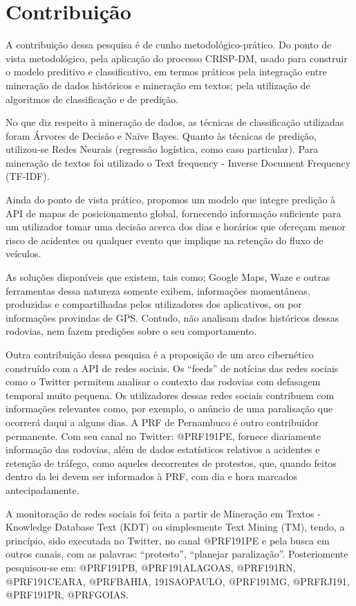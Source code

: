 \chapter{Contribuição}\label{meto}

A contribuição dessa pesquisa é de cunho metodológico-prático.
Do ponto de vista metodológico, pela aplicação do processo CRISP-DM, usado para construir o modelo preditivo e classificativo, em termos práticos pela integração entre mineração de dados históricos e mineração em textos; pela utilização de algoritmos de classificação e de predição. 

No que diz respeito à mineração de dados, as técnicas de classificação utilizadas foram Árvores de Decisão e Naïve Bayes. Quanto às técnicas de predição, utilizou-se Redes Neurais (regressão logística, como caso particular). Para mineração de textos foi utilizado o Text frequency - Inverse Document Frequency (TF-IDF).

Ainda do ponto de vista prático, propomos um modelo que integre predição à API de mapas de posicionamento global, fornecendo informação suficiente para um utilizador tomar uma decisão acerca dos dias e horários que ofereçam menor risco de acidentes ou qualquer evento que implique na retenção do fluxo de veículos. 

As soluções disponíveis que existem, tais como; Google Maps, Waze e outras ferramentas dessa natureza somente exibem, informações momentâneas, produzidas e compartilhadas pelos utilizadores dos aplicativos, ou por informações provindas de GPS. Contudo, não analisam dados históricos dessas rodovias, nem fazem predições sobre o seu comportamento.

Outra contribuição dessa pesquisa é a proposição de um arco cibernético construído com a API de redes sociais.
Os ``feeds'' de notícias das redes sociais como o Twitter permitem analisar o contexto das rodovias com defasagem temporal muito pequena.
Os utilizadores dessas redes sociais contribuem com informações relevantes como, por exemplo, o anúncio de uma paralisação que ocorrerá 
daqui a alguns dias. A PRF de Pernambuco é outro contribuidor permanente. Com seu canal no Twitter: @PRF191PE, fornece diariamente informação das rodovias, 
além de dados estatísticos relativos a acidentes e retenção de tráfego, como aqueles decorrentes de protestos, que, quando feitos dentro da lei
devem ser informados à PRF, com dia e hora marcados antecipadamente.

A monitoração de redes sociais foi feita a partir de Mineração em Textos - Knowledge Database Text (KDT) ou simplesmente Text Mining (TM), tendo, a princípio, sido executada no Twitter, no canal @PRF191PE e pela busca em outros canais, com as palavras: ``protesto'', ``planejar paralização''. Posteriomente pesquisou-se em: @PRF191PB, @PRF191ALAGOAS, @PRF191RN, @PRF191CEARA, @PRFBAHIA, 191SAOPAULO, @PRF191MG, @PRFRJ191, @PRF191PR, @PRFGOIAS. 

